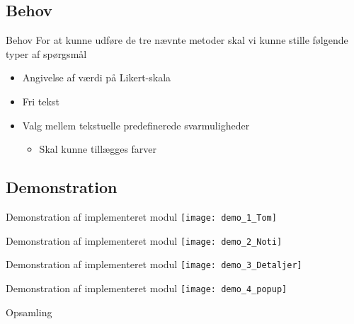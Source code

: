 \subsection{Behov}
{ %
\begin{frame}{Behov} %
For at kunne udføre de tre nævnte metoder skal vi kunne stille følgende typer af spørgsmål


\begin{itemize}
	\item Angivelse af værdi på Likert-skala
	\item Fri tekst
	\item Valg mellem tekstuelle predefinerede svarmuligheder
	\begin{itemize}
		\item Skal kunne tillægges farver
	\end{itemize}
\end{itemize}
\end{frame}}

\subsection{Demonstration}
\begin{frame}{Demonstration af implementeret modul} %
\centering
\texttt{[image: demo\_1\_Tom]}
\end{frame}

\begin{frame}{Demonstration af implementeret modul} %
	\centering
	\texttt{[image: demo\_2\_Noti]}
\end{frame}

\begin{frame}{Demonstration af implementeret modul} %
	\centering
	\texttt{[image: demo\_3\_Detaljer]}
\end{frame}

\begin{frame}{Demonstration af implementeret modul} %
	\centering
	\texttt{[image: demo\_4\_popup]}
\end{frame}

\begin{frame}{Opsamling}
	
\end{frame}